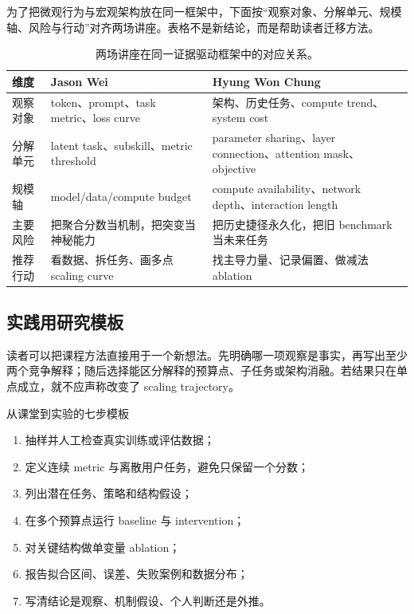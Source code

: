 为了把微观行为与宏观架构放在同一框架中，下面按“观察对象、分解单元、规模轴、风险与行动”对齐两场讲座。表格不是新结论，而是帮助读者迁移方法。

\begin{table}[H]
\centering
\begin{tabularx}{\textwidth}{L{0.18\textwidth} X X}
\toprule
维度 & Jason Wei & Hyung Won Chung \\
\midrule
观察对象 & token、prompt、task metric、loss curve & 架构、历史任务、compute trend、system cost \\
分解单元 & latent task、subskill、metric threshold & parameter sharing、layer connection、attention mask、objective \\
规模轴 & model/data/compute budget & compute availability、network depth、interaction length \\
主要风险 & 把聚合分数当机制，把突变当神秘能力 & 把历史捷径永久化，把旧 benchmark 当未来任务 \\
推荐行动 & 看数据、拆任务、画多点 scaling curve & 找主导力量、记录偏置、做减法 ablation \\
\bottomrule
\end{tabularx}
\caption{两场讲座在同一证据驱动框架中的对应关系。}
\end{table}

\subsection{实践用研究模板}

读者可以把课程方法直接用于一个新想法。先明确哪一项观察是事实，再写出至少两个竞争解释；随后选择能区分解释的预算点、子任务或架构消融。若结果只在单点成立，就不应声称改变了 scaling trajectory。

\begin{importantbox}{从课堂到实验的七步模板}
\begin{enumerate}
  \item 抽样并人工检查真实训练或评估数据；
  \item 定义连续 metric 与离散用户任务，避免只保留一个分数；
  \item 列出潜在任务、策略和结构假设；
  \item 在多个预算点运行 baseline 与 intervention；
  \item 对关键结构做单变量 ablation；
  \item 报告拟合区间、误差、失败案例和数据分布；
  \item 写清结论是观察、机制假设、个人判断还是外推。
\end{enumerate}
\end{importantbox}

